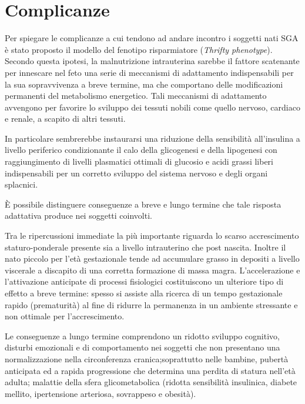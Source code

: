 \section{Complicanze}


Per spiegare le complicanze a cui tendono ad andare incontro i soggetti nati SGA è stato proposto il modello del fenotipo risparmiatore (\textit{Thrifty phenotype}).
Secondo questa ipotesi, la malnutrizione intrauterina sarebbe il fattore scatenante
per innescare nel feto una serie di meccanismi di adattamento indispensabili per 
la sua sopravvivenza a breve termine, ma che comportano delle modificazioni permanenti
del metabolismo energetico.
Tali meccanismi di adattamento avvengono per favorire lo sviluppo dei tessuti 
nobili come quello nervoso, cardiaco e renale, a scapito di altri tessuti.

In particolare sembrerebbe instaurarsi una riduzione della sensibilità all'insulina
a livello periferico condizionante il calo della glicogenesi e della lipogenesi
con raggiungimento di livelli plasmatici ottimali di glucosio e acidi grassi liberi
indispensabili per un corretto sviluppo del sistema nervoso e degli organi splacnici.\cite{sga-51}



\`E possibile distinguere conseguenze a breve e lungo termine che tale risposta
adattativa produce nei soggetti coinvolti.

Tra le ripercussioni immediate la più importante riguarda lo scarso accrescimento
staturo-ponderale presente sia a livello intrauterino che post nascita. Inoltre 
il nato piccolo per l'età gestazionale tende ad accumulare grasso in depositi a livello
viscerale a discapito di una corretta formazione di massa magra. L'accelerazione e 
l'attivazione anticipate di processi fisiologici costituiscono un ulteriore tipo di 
effetto a breve termine: spesso si assiste alla ricerca di un tempo gestazionale
rapido (prematurità) al fine di ridurre la permanenza in un ambiente stressante
e non ottimale per l'accrescimento.\cite{sga-53}

Le conseguenze a lungo termine comprendono un ridotto sviluppo cognitivo, disturbi emozionali e di comportamento nei 
soggetti che non presentano una normalizzazione nella circonferenza cranica;soprattutto nelle bambine, pubertà 
anticipata ed a rapida progressione  che determina una perdita di 
statura nell'età adulta; malattie della sfera glicometabolica (ridotta sensibilità insulinica, diabete mellito,
ipertensione arteriosa, sovrappeso e obesità).\cite{sga-32}


